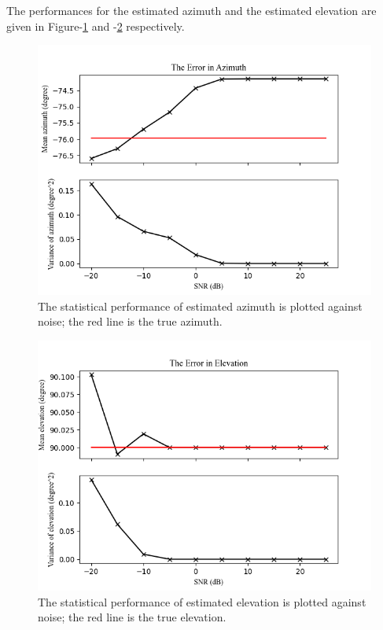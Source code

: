 \documentclass{report}
\begin{document}
The performances for the estimated azimuth and the estimated elevation are given in Figure-\ref{fig:srp_phat_noise_azimuth} and -\ref{fig:srp_phat_noise_elevation} respectively.

\begin{figure}[H]
\includegraphics[width=1\textwidth]{../Python/srp_phat/noise_azimuth.png}
\centering
\caption{The statistical performance of estimated azimuth is plotted against noise; the red line is the true azimuth.}
\label{fig:srp_phat_noise_azimuth}
\centering
\end{figure}

\begin{figure}[H]
\includegraphics[width=1\textwidth]{../Python/srp_phat/noise_elevation.png}
\centering
\caption{The statistical performance of estimated elevation is plotted against noise; the red line is the true elevation.}
\label{fig:srp_phat_noise_elevation}
\centering
\end{figure}
\end{document}
